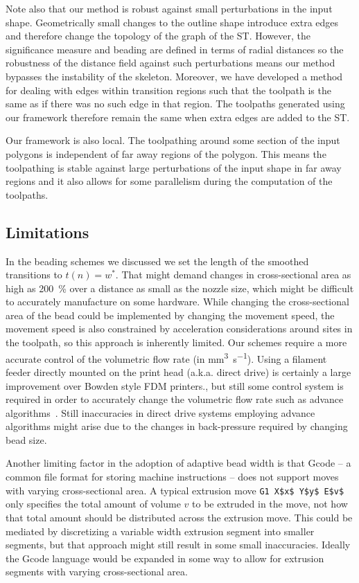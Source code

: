 Note also that our method is robust against small perturbations in the input shape.
Geometrically small changes to the outline shape introduce extra edges and therefore change the topology of the graph of the ST.
However, the significance measure and beading are defined in terms of radial distances so the robustness of the distance field against such perturbations means our method bypasses the instability of the skeleton.
Moreover, we have developed a method for dealing with edges within transition regions such that the toolpath is the same as if there was no such edge in that region.
The toolpaths generated using our framework therefore remain the same when extra edges are added to the ST.

Our framework is also local.
The toolpathing around some section of the input polygons is independent of far away regions of the polygon.
This means the toolpathing is stable against large perturbations of the input shape in far away regions
and it also allows for some parallelism during the computation of the toolpaths.



\subsection{Limitations}
In the beading schemes we discussed we set the length of the smoothed transitions to $t(n) = w^*$.
That might demand changes in cross-sectional area as high as \SI{200}{\percent} over a distance as small as the nozzle size,
which might be difficult to accurately manufacture on some hardware.
While changing the cross-sectional area of the bead could be implemented by changing the movement speed, the movement speed is also constrained by acceleration considerations around sites in the toolpath, so this approach is inherently limited.
Our schemes require a more accurate control of the volumetric flow rate (in \si{\milli\meter\cubed\per\second}).
Using a filament feeder directly mounted on the print head (a.k.a. direct drive) is certainly a large improvement over Bowden style FDM printers.,
but still some control system is required in order to accurately change the volumetric flow rate such as advance algorithms~\cite{tronvoll2019investigating}.
Still inaccuracies in direct drive systems employing advance algorithms might arise due to the changes in back-pressure required by changing bead size.


Another limiting factor in the adoption of adaptive bead width is that Gcode -- a common file format for storing machine instructions -- does not support  moves with varying cross-sectional area.
A typical extrusion move \lstinline{G1 X$x$ Y$y$ E$v$} only specifies the total amount of volume $v$ to be extruded in the move, not how that total amount should be distributed across the extrusion move.
This could be mediated by discretizing a variable width extrusion segment into smaller segments, but that approach might still result in some small inaccuracies.
Ideally the Gcode language would be expanded in some way to allow for extrusion segments with varying cross-sectional area.


